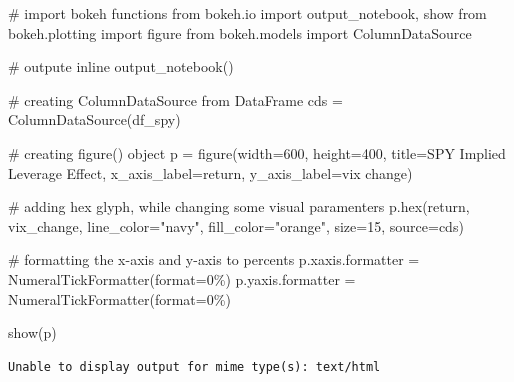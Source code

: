 \documentclass[
  letterpaper,
  DIV=11,
  numbers=noendperiod]{scrreprt}
\newenvironment{Shaded}{\begin{snugshade}}{\end{snugshade}}
\newcommand{\BuiltInTok}[1]{\textcolor[rgb]{0.00,0.23,0.31}{#1}}
\newcommand{\CommentTok}[1]{\textcolor[rgb]{0.37,0.37,0.37}{#1}}
\newcommand{\DecValTok}[1]{\textcolor[rgb]{0.68,0.00,0.00}{#1}}
\newcommand{\ImportTok}[1]{\textcolor[rgb]{0.00,0.46,0.62}{#1}}
\newcommand{\NormalTok}[1]{\textcolor[rgb]{0.00,0.23,0.31}{#1}}
\newcommand{\OperatorTok}[1]{\textcolor[rgb]{0.37,0.37,0.37}{#1}}
\newcommand{\StringTok}[1]{\textcolor[rgb]{0.13,0.47,0.30}{#1}}
\begin{document}
\begin{Shaded}
\begin{Highlighting}[]
\CommentTok{\# import bokeh functions}
\ImportTok{from}\NormalTok{ bokeh.io }\ImportTok{import}\NormalTok{ output\_notebook, show}
\ImportTok{from}\NormalTok{ bokeh.plotting }\ImportTok{import}\NormalTok{ figure}
\ImportTok{from}\NormalTok{ bokeh.models }\ImportTok{import}\NormalTok{ ColumnDataSource}

\CommentTok{\# outpute inline}
\NormalTok{output\_notebook()}

\CommentTok{\# creating ColumnDataSource from DataFrame}
\NormalTok{cds }\OperatorTok{=}\NormalTok{ ColumnDataSource(df\_spy)}

\CommentTok{\# creating figure() object}
\NormalTok{p }\OperatorTok{=}\NormalTok{ figure(width}\OperatorTok{=}\DecValTok{600}\NormalTok{, height}\OperatorTok{=}\DecValTok{400}\NormalTok{, title}\OperatorTok{=}\StringTok{\textquotesingle{}SPY Implied Leverage Effect\textquotesingle{}}\NormalTok{,}
\NormalTok{           x\_axis\_label}\OperatorTok{=}\StringTok{\textquotesingle{}return\textquotesingle{}}\NormalTok{, y\_axis\_label}\OperatorTok{=}\StringTok{\textquotesingle{}vix change\textquotesingle{}}\NormalTok{)}

\CommentTok{\# adding hex glyph, while changing some visual paramenters}
\NormalTok{p.}\BuiltInTok{hex}\NormalTok{(}\StringTok{\textquotesingle{}return\textquotesingle{}}\NormalTok{, }\StringTok{\textquotesingle{}vix\_change\textquotesingle{}}\NormalTok{, line\_color}\OperatorTok{=}\StringTok{"navy"}\NormalTok{, fill\_color}\OperatorTok{=}\StringTok{"orange"}\NormalTok{, size}\OperatorTok{=}\DecValTok{15}\NormalTok{, source}\OperatorTok{=}\NormalTok{cds)}

\CommentTok{\# formatting the x{-}axis and y{-}axis to percents}
\NormalTok{p.xaxis.formatter }\OperatorTok{=}\NormalTok{ NumeralTickFormatter(}\BuiltInTok{format}\OperatorTok{=}\StringTok{\textquotesingle{}0\%\textquotesingle{}}\NormalTok{) }
\NormalTok{p.yaxis.formatter }\OperatorTok{=}\NormalTok{ NumeralTickFormatter(}\BuiltInTok{format}\OperatorTok{=}\StringTok{\textquotesingle{}0\%\textquotesingle{}}\NormalTok{)}

\NormalTok{show(p)}
\end{Highlighting}
\end{Shaded}

\begin{verbatim}
Unable to display output for mime type(s): text/html
\end{verbatim}
\end{document}
